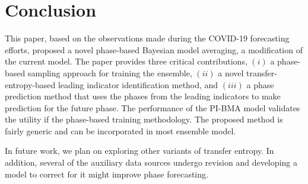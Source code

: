 \documentclass[conference,compsoc]{IEEEtran}
\begin{document}




\section{Conclusion}
This paper, based on the observations made during the COVID-19 forecasting efforts, proposed a novel phase-based Bayesian model averaging, a modification of the current model. The paper provides three critical contributions, $(i)$ a phase-based sampling approach for training the ensemble, $(ii)$ a novel transfer-entropy-based leading indicator identification method, and $(iii)$ a phase prediction method that uses the phases from the leading indicators to make prediction for the future phase. The performance of the PI-BMA model validates the utility if the  phase-based training methodology. The proposed method is fairly generic and can be incorporated in most ensemble model.

In future work, we plan on exploring other variants of transfer entropy. In addition, several of the auxiliary data sources undergo revision and developing a model to correct for it might improve phase forecasting.   






\end{document}
